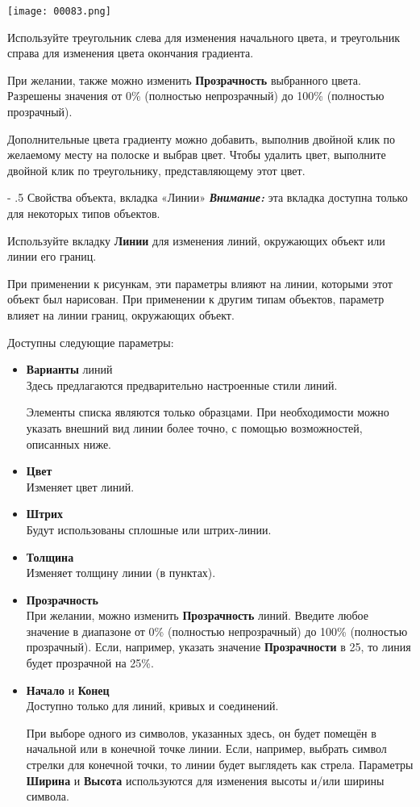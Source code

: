 \documentclass[a4paper,10pt]{article}
\makeatletter
\renewcommand\paragraph{%
   \@startsection{paragraph}{4}{0mm}%
      {-\baselineskip}%
      {.5\baselineskip}%
      {\normalfont\normalsize\bfseries}}
\makeatother
\begin{document}
\texttt{[image: 00083.png]}

Используйте треугольник слева для изменения начального цвета, и треугольник справа для изменения цвета окончания градиента.

При желании, также можно изменить \textbf{Прозрачность} выбранного цвета. Разрешены значения от 0\% (полностью непрозрачный) до 100\% (полностью прозрачный).

Дополнительные цвета градиенту можно добавить, выполнив двойной клик по желаемому месту на полоске и выбрав цвет. Чтобы удалить цвет, выполните двойной клик по треугольнику, представляющему этот цвет.

\paragraph{Свойства объекта, вкладка «Линии»}
\textbf{\textit{Внимание:}} эта вкладка доступна только для некоторых типов объектов.

Используйте вкладку \textbf{Линии} для изменения линий, окружающих объект или линии его границ.

При применении к рисункам, эти параметры влияют на линии, которыми этот объект был нарисован. При применении к другим типам объектов, параметр влияет на линии границ, окружающих объект. 

Доступны следующие параметры:

\begin{itemize}
 \item \textbf{Варианты} линий\\
 Здесь предлагаются предварительно настроенные стили линий.
 
 Элементы списка являются только образцами. При необходимости можно указать внешний вид линии более точно, с помощью возможностей, описанных ниже.
 \item \textbf{Цвет}\\
 Изменяет цвет линий.
 \item \textbf{Штрих}\\
 Будут использованы сплошные или штрих-линии.
 \item \textbf{Толщина}\\
 Изменяет толщину линии (в пунктах).
 \item \textbf{Прозрачность}\\
 При желании, можно изменить \textbf{Прозрачность} линий. Введите любое значение в диапазоне от 0\% (полностью непрозрачный) до 100\% (полностью прозрачный). Если, например, указать значение \textbf{Прозрачности} в 25, то линия будет прозрачной на 25\%.
 \item \textbf{Начало} и \textbf{Конец}\\
 Доступно только для линий, кривых и соединений.
 
 При выборе одного из символов, указанных здесь, он будет помещён в начальной или в конечной точке линии. Если, например, выбрать символ стрелки для конечной точки, то линии будет выглядеть как стрела. Параметры \textbf{Ширина} и \textbf{Высота} используются для изменения высоты и/или ширины символа.
 \end{itemize}
 
\end{document}
